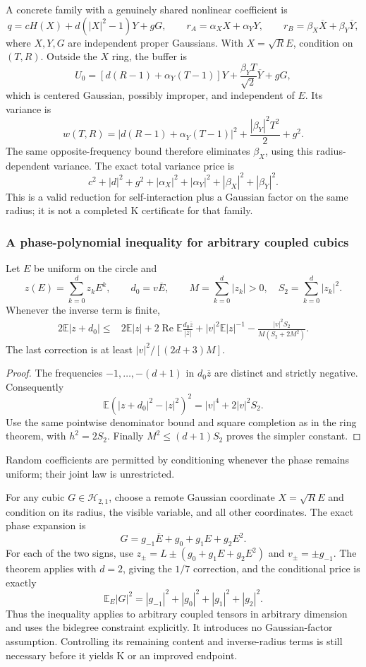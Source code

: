 A concrete family with a genuinely shared nonlinear coefficient is
\[
q=cH(X)+d(|X|^2-1)Y+gG,\qquad
r_A=\alpha_X X+\alpha_Y Y,\qquad
r_B=\beta_X\overline X+\beta_Y\overline Y,
\]
where $X,Y,G$ are independent proper Gaussians. With $X=\sqrt R E$, condition on $(T,R)$. Outside the $X$ ring, the buffer is
\[
U_0=[d(R-1)+\alpha_Y(T-1)]Y+\frac{\beta_YT}{\sqrt2}\overline Y+gG,
\]
which is centered Gaussian, possibly improper, and independent of $E$. Its variance is
\[
w(T,R)=|d(R-1)+\alpha_Y(T-1)|^2+\frac{|\beta_Y|^2T^2}{2}+g^2.
\]
The same opposite-frequency bound therefore eliminates $\beta_X$, using this radius-dependent variance. The exact total variance price is
\[
c^2+|d|^2+g^2+|\alpha_X|^2+|\alpha_Y|^2+|\beta_X|^2+|\beta_Y|^2.
\]
This is a valid reduction for self-interaction plus a Gaussian factor on the same radius; it is not a completed K certificate for that family.

\subsubsection{A phase-polynomial inequality for arbitrary coupled cubics}
\begin{theorem}
Let $E$ be uniform on the circle and
\[
z(E)=\sum_{k=0}^d z_kE^k,\qquad d_0=v\overline E,
\qquad M=\sum_{k=0}^d|z_k|>0,\quad S_2=\sum_{k=0}^d|z_k|^2.
\]
Whenever the inverse term is finite,
\begin{align*}
2\mathbb E|z+d_0|\le{}&2\mathbb E|z|
 +2\operatorname{Re}\mathbb E\frac{d_0\overline z}{|z|}
 +|v|^2\mathbb E|z|^{-1}
 -\frac{|v|^2S_2}{M(S_2+2M^2)}. 
\end{align*}
The last correction is at least $|v|^2/[(2d+3)M]$.
\end{theorem}
\begin{proof}
The frequencies $-1,\ldots,-(d+1)$ in $d_0\overline z$ are distinct and strictly negative. Consequently
\[
\mathbb E(|z+d_0|^2-|z|^2)^2=|v|^4+2|v|^2S_2.
\]
Use the same pointwise denominator bound and square completion as in the ring theorem, with $h^2=2S_2$. Finally $M^2\le(d+1)S_2$ proves the simpler constant.
\end{proof}
Random coefficients are permitted by conditioning whenever the phase remains uniform; their joint law is unrestricted.

For any cubic $G\in\mathcal H_{2,1}$, choose a remote Gaussian coordinate $X=\sqrt R E$ and condition on its radius, the visible variable, and all other coordinates. The exact phase expansion is
\[
G=g_{-1}\overline E+g_0+g_1E+g_2E^2.
\]
For each of the two signs, use
$z_\pm=L\pm(g_0+g_1E+g_2E^2)$ and $v_\pm=\pm g_{-1}$.
The theorem applies with $d=2$, giving the $1/7$ correction, and the conditional price is exactly
\[
\mathbb E_E|G|^2=|g_{-1}|^2+|g_0|^2+|g_1|^2+|g_2|^2.
\]
Thus the inequality applies to arbitrary coupled tensors in arbitrary dimension and uses the bidegree constraint explicitly. It introduces no Gaussian-factor assumption. Controlling its remaining content and inverse-radius terms is still necessary before it yields K or an improved endpoint.

